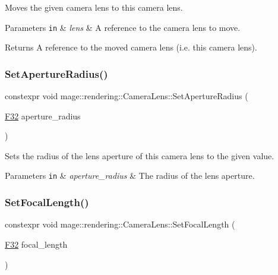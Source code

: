 Moves the given camera lens to this camera lens.


\begin{DoxyParams}[1]{Parameters}
\mbox{\tt in}  & {\em lens} & A reference to the camera lens to move. \\
\hline
\end{DoxyParams}
\begin{DoxyReturn}{Returns}
A reference to the moved camera lens (i.\+e. this camera lens). 
\end{DoxyReturn}
\mbox{\label{classmage_1_1rendering_1_1_camera_lens_aeaf06e7e7ee0fadda24123b9f457312d}} 
\subsubsection{\texorpdfstring{Set\+Aperture\+Radius()}{SetApertureRadius()}}
{\footnotesize\ttfamily constexpr void mage\+::rendering\+::\+Camera\+Lens\+::\+Set\+Aperture\+Radius (\begin{DoxyParamCaption}\item[{\mbox{\hyperlink{namespacemage_aa97e833b45f06d60a0a9c4fc22ae02c0}{F32}}}]{aperture\+\_\+radius }\end{DoxyParamCaption})\hspace{0.3cm}{\ttfamily [noexcept]}}

Sets the radius of the lens aperture of this camera lens to the given value.


\begin{DoxyParams}[1]{Parameters}
\mbox{\tt in}  & {\em aperture\+\_\+radius} & The radius of the lens aperture. \\
\hline
\end{DoxyParams}
\mbox{\label{classmage_1_1rendering_1_1_camera_lens_ad954dd19be6f0cc54c74aecf29bb2134}} 
\subsubsection{\texorpdfstring{Set\+Focal\+Length()}{SetFocalLength()}}
{\footnotesize\ttfamily constexpr void mage\+::rendering\+::\+Camera\+Lens\+::\+Set\+Focal\+Length (\begin{DoxyParamCaption}\item[{\mbox{\hyperlink{namespacemage_aa97e833b45f06d60a0a9c4fc22ae02c0}{F32}}}]{focal\+\_\+length }\end{DoxyParamCaption})\hspace{0.3cm}{\ttfamily [noexcept]}}

